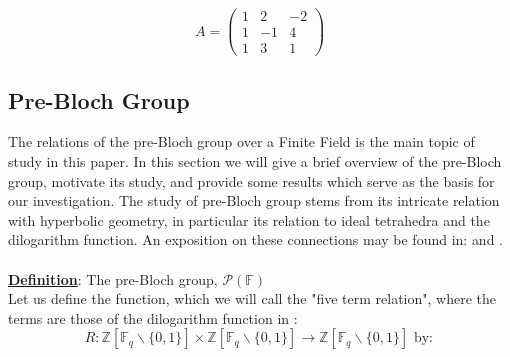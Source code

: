 \documentclass[11pt]{article}
\theoremstyle{plain}
\theoremstyle{definition}
\begin{document}
\[ A = \left( \begin{array}{ccc}
1 &2&-2 \\
1&-1&4\\
1&3&1  
\end{array}\right) \]



\pagebreak
\subsection{Pre-Bloch Group}\label{section:Pre-Bloch Group}
The relations of the pre-Bloch group over a Finite Field is the main topic of study in this paper. In this section we will give a brief overview of the pre-Bloch group, motivate its study, and provide some results which serve as the basis for our investigation. The study of pre-Bloch group stems from its intricate relation with hyperbolic geometry, in particular its relation to ideal tetrahedra and the dilogarithm function. An exposition on these connections may be found in: \cite{ArithmeticHyperbolic} and \cite{Zagier2007}. \\
\\
\textbf{\underline{Definition}}: The pre-Bloch group, $\mathcal{P}(\mathbb{F})$  \\Let us define the function, which we will call the "five term relation", where the terms are those of the dilogarithm function in \cite{Zagier2007}:\\
\begin{equation*}
R:  \mathbb{Z} [\mathbb{F}_{q}  \backslash \{0,1\}] \times \mathbb{Z} [\mathbb{F}_{q}  \backslash \{0,1\}]  \rightarrow \mathbb{Z} [\mathbb{F}_{q}  \backslash \{0,1\}]\text{ by}:
\end{equation*}
\end{document}
